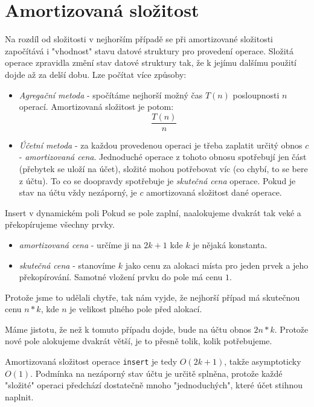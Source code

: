 \documentclass[a4paper]{article}      %
\newenvironment{example}[1][Příklad]{\begin{trivlist}
\item[\hskip \labelsep {\bfseries #1}]}{\end{trivlist}}
\begin{document}
\section*{Amortizovaná složitost}
Na rozdíl od složitosti v nejhorším případě se při amortizované složitosti započítává i "vhodnost" stavu
datové struktury pro provedení operace. Složitá operace zpravidla změní stav datové struktury tak, že k jejímu dalšímu použití
dojde až za delší dobu. Lze počítat více způsoby:

\begin{itemize}
\item \emph{Agregační metoda} - spočítáme nejhorší možný čas $T(n)$ posloupnosti $n$ operací. Amortizovaná složitost je potom:
\[
\frac{T(n)}{n}
\]
\item \emph{Účetní metoda} - za každou provedenou operaci je třeba zaplatit určitý obnos $c$ - \emph{amortizovaná cena}.
Jednoduché operace z tohoto obnosu spotřebují jen část (přebytek se uloží na účet),
složité mohou potřebovat víc (co chybí, to se bere z účtu). To co se doopravdy spotřebuje je \emph{skutečná cena} operace.
Pokud je stav na účtu vždy nezáporný, je $c$ amortizovaná složitost dané operace.
\end{itemize}

\begin{example}{Insert v dynamickém poli}
Pokud se pole zaplní, naalokujeme dvakrát tak veké a překopírujeme všechny prvky.
\begin{itemize}
\item \emph{amortizovaná cena} - určíme ji na $2k+1$ kde $k$ je nějaká konstanta.
\item \emph{skutečná cena} - stanovíme $k$ jako cenu za alokaci místa pro jeden prvek a jeho překopírování. Samotné vložení prvku do pole má cenu $1$.
\end{itemize}
Protože jsme to udělali chytře, tak nám vyjde, že nejhorší případ má skutečnou cenu $n*k$, kde $n$ je velikost plného pole před alokací.

Máme jistotu, že než k tomuto případu dojde, bude na účtu obnos $2n*k$. Protože nové pole alokujeme dvakrát větší, je to přesně tolik, kolik potřebujeme.

Amortizovaná složitost operace \verb+insert+ je tedy $O(2k+1)$, takže asymptoticky $O(1)$. Podmínka na nezáporný stav účtu je určitě splněna, protože každé "složité" operaci předchází dostatečně mnoho "jednoduchých", které účet stihnou naplnit. 
\end{example}
\end{document}
